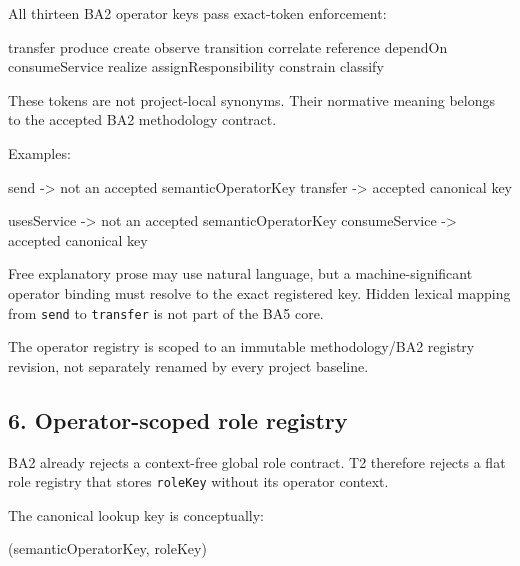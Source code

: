 \documentclass[
  10pt,
  a4paper,
]{article}
\newenvironment{Shaded}{}{}
\newcommand{\NormalTok}[1]{#1}
\begin{document}
All thirteen BA2 operator keys pass exact-token enforcement:

\begin{Shaded}
\begin{Highlighting}[]
\NormalTok{transfer}
\NormalTok{produce}
\NormalTok{create}
\NormalTok{observe}
\NormalTok{transition}
\NormalTok{correlate}
\NormalTok{reference}
\NormalTok{dependOn}
\NormalTok{consumeService}
\NormalTok{realize}
\NormalTok{assignResponsibility}
\NormalTok{constrain}
\NormalTok{classify}
\end{Highlighting}
\end{Shaded}

These tokens are not project-local synonyms. Their normative meaning
belongs to the accepted BA2 methodology contract.

Examples:

\begin{Shaded}
\begin{Highlighting}[]
\NormalTok{send            {-}\textgreater{} not an accepted semanticOperatorKey}
\NormalTok{transfer        {-}\textgreater{} accepted canonical key}

\NormalTok{usesService     {-}\textgreater{} not an accepted semanticOperatorKey}
\NormalTok{consumeService  {-}\textgreater{} accepted canonical key}
\end{Highlighting}
\end{Shaded}

Free explanatory prose may use natural language, but a
machine-significant operator binding must resolve to the exact
registered key. Hidden lexical mapping from \texttt{send} to
\texttt{transfer} is not part of the BA5 core.

The operator registry is scoped to an immutable methodology/BA2 registry
revision, not separately renamed by every project baseline.

\subsection{6. Operator-scoped role
registry}\label{operator-scoped-role-registry}

BA2 already rejects a context-free global role contract. T2 therefore
rejects a flat role registry that stores \texttt{roleKey} without its
operator context.

The canonical lookup key is conceptually:

\begin{Shaded}
\begin{Highlighting}[]
\NormalTok{(semanticOperatorKey, roleKey)}
\end{Highlighting}
\end{Shaded}
\end{document}
